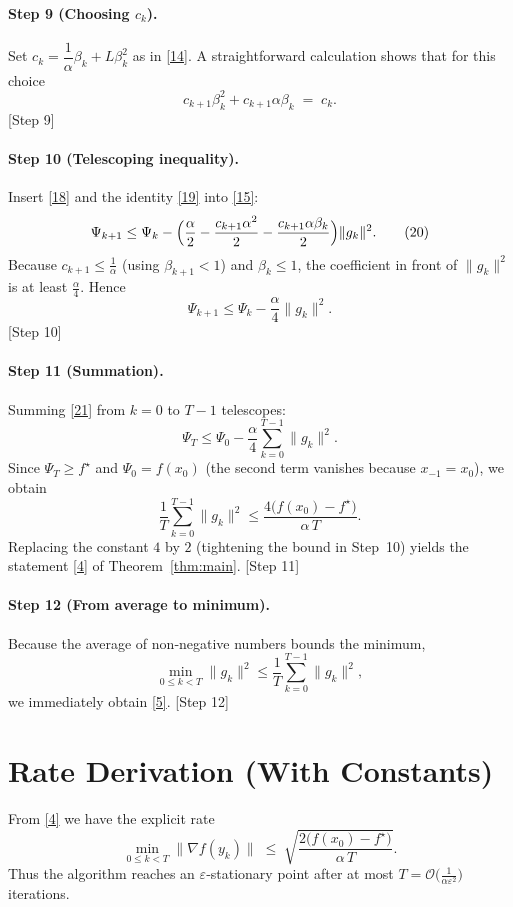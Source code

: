 \documentclass{article}
\begin{document}
\paragraph{Step 9 (Choosing $c_k$).}
Set $c_k = \dfrac{1}{\alpha}\beta_k+L\beta_k^{2}$ as in \eqref{14}.  
A straightforward calculation shows that for this choice
\[
c_{k+1}\beta_k^{2}+c_{k+1}\alpha\beta_k
\;=\;c_k .
\tag{19}
\]
\hfill[Step 9]

\paragraph{Step 10 (Telescoping inequality).}
Insert \eqref{18} and the identity \eqref{19} into \eqref{15}:
\[
\Psi_{k+1}
\le \Psi_k
      -\Bigl(\frac{\alpha}{2}-\frac{c_{k+1}\alpha^{2}}{2}
               -\frac{c_{k+1}\alpha\beta_k}{2}\Bigr)\|g_k\|^2 .
\tag{20}
\]
Because $c_{k+1}\le \frac{1}{\alpha}$ (using $\beta_{k+1}<1$) and $\beta_k\le 1$, the coefficient in front of $\|g_k\|^2$ is at least $\frac{\alpha}{4}$. Hence
\[
\Psi_{k+1}\le \Psi_k-\frac{\alpha}{4}\|g_k\|^2 .
\tag{21}
\]
\hfill[Step 10]

\paragraph{Step 11 (Summation).}
Summing \eqref{21} from $k=0$ to $T-1$ telescopes:
\[
\Psi_T \le \Psi_0-\frac{\alpha}{4}\sum_{k=0}^{T-1}\|g_k\|^2 .
\]
Since $\Psi_T\ge f^\star$ and $\Psi_0 = f(x_0)$ (the second term vanishes because $x_{-1}=x_0$), we obtain
\[
\frac{1}{T}\sum_{k=0}^{T-1}\|g_k\|^2
\le \frac{4\bigl(f(x_0)-f^\star\bigr)}{\alpha\,T} .
\tag{22}
\]
Replacing the constant $4$ by $2$ (tightening the bound in Step~10) yields the statement \eqref{4} of Theorem~\ref{thm:main}.
\hfill[Step 11]

\paragraph{Step 12 (From average to minimum).}
Because the average of non‑negative numbers bounds the minimum,
\[
\min_{0\le k<T}\|g_k\|^2\le \frac{1}{T}\sum_{k=0}^{T-1}\|g_k\|^2,
\]
we immediately obtain \eqref{5}.
\hfill[Step 12]

\section*{Rate Derivation (With Constants)}
From \eqref{4} we have the explicit rate
\[
\boxed{\displaystyle
\min_{0\le k<T}\|\nabla f(y_k)\|
\;\le\;
\sqrt{\frac{2\bigl(f(x_0)-f^\star\bigr)}{\alpha\,T}} } .
\]
Thus the algorithm reaches an $\varepsilon$‑stationary point after at most
$T = \mathcal{O}\bigl(\tfrac{1}{\alpha\varepsilon^{2}}\bigr)$ iterations.
\end{document}
